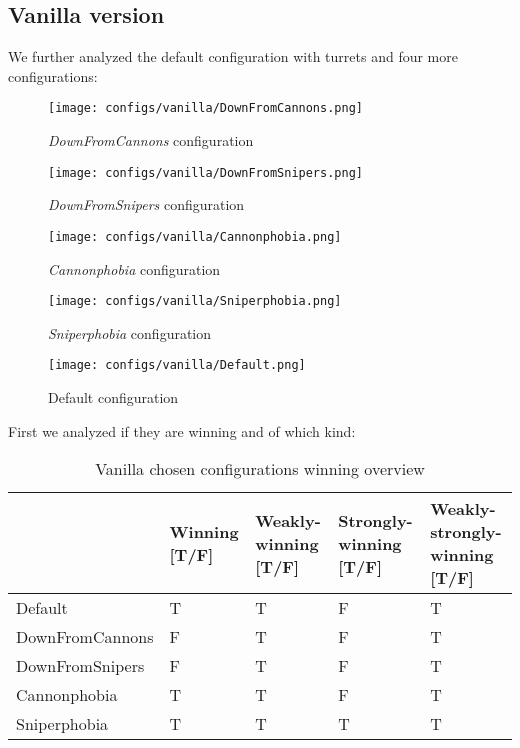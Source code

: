 \documentclass[
10pt, %
a4paper, %
oneside, %
headinclude,footinclude, %
BCOR5mm, %
]{scrartcl}
\begin{document}
		\subsection{Vanilla version}
			We further analyzed the default configuration with turrets and four more configurations:
			\begin{figure}[h!]
				\centering
				\begin{minipage}{.4\textwidth}
					\centering
					\texttt{[image: configs/vanilla/DownFromCannons.png]}
					\caption{\emph{DownFromCannons} configuration}
				\end{minipage}
				\begin{minipage}{.5\textwidth}
					\centering
					\texttt{[image: configs/vanilla/DownFromSnipers.png]}
					\caption{\emph{DownFromSnipers} configuration}
				\end{minipage}
			\end{figure}
			\begin{figure}[h!]
				\centering
				\begin{minipage}{.4\textwidth}
					\centering
					\texttt{[image: configs/vanilla/Cannonphobia.png]}
					\caption{\emph{Cannonphobia} configuration}
				\end{minipage}
				\begin{minipage}{.5\textwidth}
					\centering
					\texttt{[image: configs/vanilla/Sniperphobia.png]}
					\caption{\emph{Sniperphobia} configuration}
				\end{minipage}
			\end{figure}
			\begin{figure}[h!]
				\centering
				\centering
				\texttt{[image: configs/vanilla/Default.png]}
				\caption{Default configuration}
			\end{figure}
			First we analyzed if they are winning and of which kind:
			\begin{table}[h!]
				\centering
				\begin{tabularx}{\textwidth}{||X|>{\raggedright\arraybackslash}X|>{\raggedright\arraybackslash}X|>{\raggedright\arraybackslash}X|>{\raggedright\arraybackslash}X||}
					\hline
					& Winning [T/F] & Weakly-winning [T/F] & Strongly-winning [T/F] & Weakly-strongly-winning [T/F] \\
					\hline
					Default 		& T & T & F & T \\ \hline
					DownFromCannons & F & T & F & T \\ \hline
					DownFromSnipers & F & T & F & T \\ \hline
					Cannonphobia 	& T & T & F & T \\ \hline
					Sniperphobia 	& T & T & T & T \\ \hline
				\end{tabularx}
				\caption{Vanilla chosen configurations winning overview}
			\end{table}
			
\end{document}
